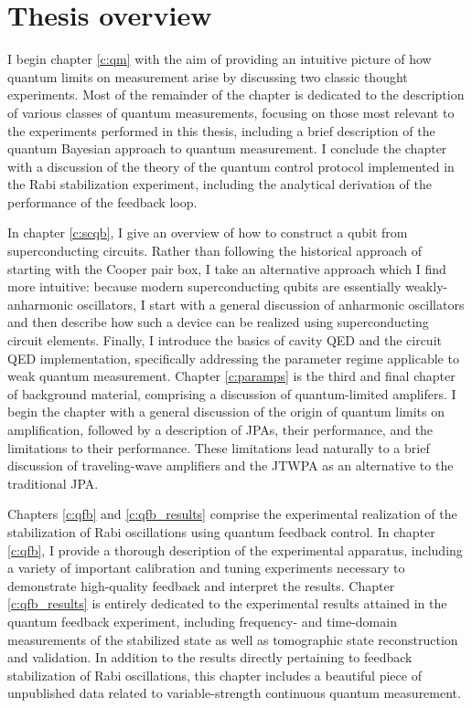 \section{Thesis overview}

I begin chapter \ref{c:qm} with the aim of providing an intuitive picture of how quantum limits on measurement arise by discussing two classic thought experiments.  Most of the remainder of the chapter is dedicated to the description of various classes of quantum measurements, focusing on those most relevant to the experiments performed in this thesis, including a brief description of the quantum Bayesian approach to quantum measurement.  I conclude the chapter with a discussion of the theory of the quantum control protocol implemented in the Rabi stabilization experiment, including the analytical derivation of the performance of the feedback loop.

In chapter \ref{c:scqb}, I give an overview of how to construct a qubit from superconducting circuits.  Rather than following the historical approach of starting with the Cooper pair box, I take an alternative approach which I find more intuitive: because modern superconducting qubits are essentially weakly-anharmonic oscillators, I start with a general discussion of anharmonic oscillators and then describe how such a device can be realized using superconducting circuit elements.  Finally, I introduce the basics of cavity QED and the circuit QED implementation, specifically addressing the parameter regime applicable to weak quantum measurement.  Chapter \ref{c:paramps} is the third and final chapter of background material, comprising a discussion of quantum-limited amplifers.  I begin the chapter with a general discussion of the origin of quantum limits on amplification, followed by a description of JPAs, their performance, and the limitations to their performance.  These limitations lead naturally to a brief discussion of traveling-wave amplifiers and the JTWPA as an alternative to the traditional JPA.

Chapters \ref{c:qfb} and \ref{c:qfb_results} comprise the experimental realization of the stabilization of Rabi oscillations using quantum feedback control.  In chapter \ref{c:qfb}, I provide a thorough description of the experimental apparatus, including a variety of important calibration and tuning experiments necessary to demonstrate high-quality feedback and interpret the results.  Chapter \ref{c:qfb_results} is entirely dedicated to the experimental results attained in the quantum feedback experiment, including frequency- and time-domain measurements of the stabilized state as well as tomographic state reconstruction and validation.  In addition to the results directly pertaining to feedback stabilization of Rabi oscillations, this chapter includes a beautiful piece of unpublished data related to variable-strength continuous quantum measurement.

